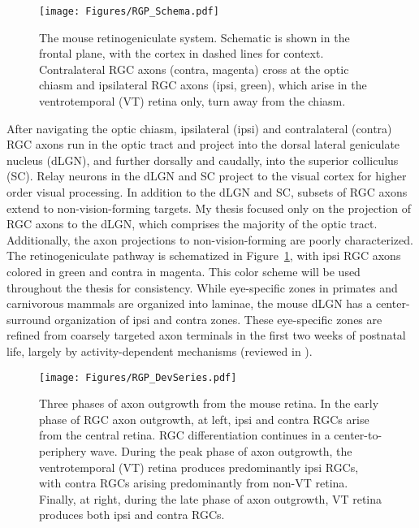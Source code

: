 \begin{figure}[hbtp]
    \begin{center}
        \texttt{[image: Figures/RGP\_Schema.pdf]}
        \caption[The mouse retinogeniculate system.]
        {The mouse retinogeniculate system.
        Schematic is shown in the frontal plane, with the cortex in dashed lines for context.
        Contralateral RGC axons (contra, magenta) cross at the optic chiasm and ipsilateral RGC axons (ipsi, green), which arise in the ventrotemporal (VT) retina only, turn away from the chiasm.}
        \label{Figures/RGPSchema}
    \end{center}
\end{figure}
After navigating the optic chiasm, ipsilateral (ipsi) and contralateral (contra) RGC axons run in the optic tract and project into the dorsal lateral geniculate nucleus (dLGN), and further dorsally and caudally, into the superior colliculus (SC).
Relay neurons in the dLGN and SC project to the visual cortex for higher order visual processing.
In addition to the dLGN and SC, subsets of RGC axons extend to non-vision-forming targets.
My thesis focused only on the projection of RGC axons to the dLGN, which comprises the majority of the optic tract.
Additionally, the axon projections to non-vision-forming are poorly characterized.
The retinogeniculate pathway is schematized in Figure~\ref{Figures/RGPSchema}, with ipsi RGC axons colored in green and contra in magenta.
This color scheme will be used throughout the thesis for consistency.
While eye-specific zones in primates and carnivorous mammals are organized into laminae, the mouse dLGN has a center-surround organization of ipsi and contra zones.
These eye-specific zones are refined from coarsely targeted axon terminals in the first two weeks of postnatal life, largely by activity-dependent mechanisms (reviewed in ).
\begin{figure}[hbtp]
    \begin{center}
        \texttt{[image: Figures/RGP\_DevSeries.pdf]}
        \caption[Three phases of axon outgrowth from the mouse retina.]
        {Three phases of axon outgrowth from the mouse retina.
        In the early phase of RGC axon outgrowth, at left, ipsi and contra RGCs arise from the central retina.
        RGC differentiation continues in a center-to-periphery wave.
        During the peak phase of axon outgrowth, the ventrotemporal (VT) retina produces predominantly ipsi RGCs, with contra RGCs arising predominantly from non-VT retina.
        Finally, at right, during the late phase of axon outgrowth, VT retina produces both ipsi and contra RGCs.}
        \label{Figures/RGPDevSeries}
    \end{center}
\end{figure}

